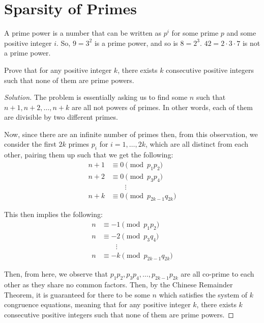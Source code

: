 \documentclass{article}
\newenvironment{solution}{\begin{proof}[Solution]}{\end{proof}}
\begin{document}
\section{Sparsity of Primes}
\begin{hw}
	A prime power is a number that can be written as $p^i$ for some prime $p$ and some
	positive integer $i$. So, $9 = 3^2$ is a prime power, and so is $8 = 2^3$. $42 = 2 \cdot 3 \cdot 7$ is not
	a prime power.
	
	Prove that for any positive integer $k$, there exists $k$ consecutive positive integers
	such that none of them are prime powers.
\end{hw}
\begin{solution}
	The problem is essentially asking us to find some $n$ such that $n + 1, n + 2, \ldots, n + k$ are all not powers of primes. In other words, each of them are divisible by two different primes.
	
	Now, since there are an infinite number of primes then, from this observation, we consider the first $2k$ primes $p_{i}$ for $i = 1, \ldots, 2k$, which are all distinct from each other, pairing them up such that we get the following:
	\begin{align*}
		n + 1 &\equiv 0 \pmod{p_{1}p_{2}} \\
		n + 2 &\equiv 0 \pmod{p_{3}p_{4}} \\
		&\qquad\vdots \\
		n + k &\equiv 0 \pmod{p_{2k-1}q_{2k}}
	\end{align*}

	This then implies the following:
	\begin{align*}
		n &\equiv - 1 \pmod{p_{1}p_{2}} \\
		n &\equiv -2 \pmod{p_{3}q_{4}} \\
		&\qquad\vdots \\
		n &\equiv -k \pmod{p_{2k-1}q_{2k}}
	\end{align*}

	Then, from here, we observe that $p_{1}p_{2}, p_{3}p_{4}, \ldots, p_{2k-1}p_{2k}$ are all co-prime to each other as they share no common factors. Then, by the Chinese Remainder Theorem, it is guaranteed for there to be some $n$ which satisfies the system of $k$ congruence equations, meaning that for any positive integer $k$, there exists $k$ consecutive positive integers such that none of them are prime powers.
\end{solution}

\newpage
\end{document}

